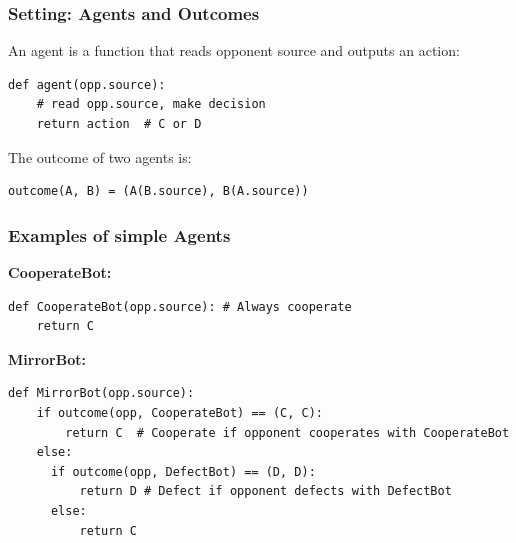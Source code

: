 \documentclass[t,11pt]{beamer}
\begin{document}
\begin{frame}[fragile]
  \frametitle{Setting: Agents and Outcomes}
  
  An agent is a function that reads opponent source and outputs an action:
  
  \begin{center}
    \begin{lstlisting}
def agent(opp.source):
    # read opp.source, make decision
    return action  # C or D
    \end{lstlisting}
  \end{center}
  
  The outcome of two agents is:
  
  \begin{center}
    \begin{lstlisting}
outcome(A, B) = (A(B.source), B(A.source))
    \end{lstlisting}
  \end{center}
  
\end{frame}

\begin{frame}[fragile]
  \frametitle{Examples of simple Agents}
  
  \small{\textbf{CooperateBot:}}
  \begin{center}
    \begin{lstlisting}
def CooperateBot(opp.source): # Always cooperate
    return C
    \end{lstlisting}

  \end{center}

  \vspace{0.3cm}
  \small{\textbf{MirrorBot:}}
  \begin{center}
    \begin{lstlisting}
def MirrorBot(opp.source):
    if outcome(opp, CooperateBot) == (C, C):
        return C  # Cooperate if opponent cooperates with CooperateBot
    else:
      if outcome(opp, DefectBot) == (D, D):
          return D # Defect if opponent defects with DefectBot
      else:
          return C
    \end{lstlisting}
  \end{center}
\end{frame}
\end{document}
